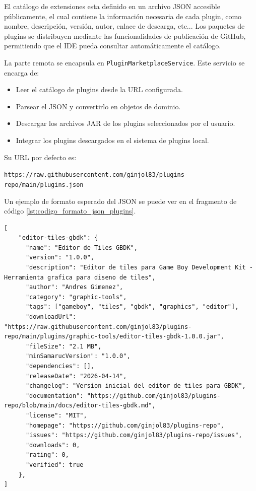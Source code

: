 \documentclass[../../main.tex]{subfiles}
\begin{document}
El catálogo de extensiones esta definido en un archivo JSON accesible públicamente, el cual contiene la información necesaria de cada plugin, como nombre, descripción, versión, autor, enlace de descarga, etc... Los paquetes de plugins se distribuyen mediante las funcionalidades de publicación de GitHub, permitiendo que el IDE pueda consultar automáticamente el catálogo.



La parte remota se encapsula en \lstinline|PluginMarketplaceService|. Este servicio se encarga de:

\begin{itemize}
    \item Leer el catálogo de plugins desde la URL configurada.
    \item Parsear el JSON y convertirlo en objetos de dominio.
    \item Descargar los archivos JAR de los plugins seleccionados por el usuario.
    \item Integrar los plugins descargados en el sistema de plugins local.
\end{itemize}

\clearpage

Su URL por defecto es: 

\lstinline|https://raw.githubusercontent.com/ginjol83/plugins-repo/main/plugins.json|

Un ejemplo de formato esperado del JSON se puede ver en el fragmento de código \ref{lst:codigo_formato_json_plugins}.

\begin{lstlisting}[style=mystyle, caption={Formato esperado del JSON para el marketplace de plugins}, label={lst:codigo_formato_json_plugins}]
[
    "editor-tiles-gbdk": {
      "name": "Editor de Tiles GBDK",
      "version": "1.0.0",
      "description": "Editor de tiles para Game Boy Development Kit - Herramienta grafica para diseno de tiles",
      "author": "Andres Gimenez",
      "category": "graphic-tools",
      "tags": ["gameboy", "tiles", "gbdk", "graphics", "editor"],
      "downloadUrl": "https://raw.githubusercontent.com/ginjol83/plugins-repo/main/plugins/graphic-tools/editor-tiles-gbdk-1.0.0.jar",
      "fileSize": "2.1 MB",
      "minSamarucVersion": "1.0.0",
      "dependencies": [],
      "releaseDate": "2026-04-14",
      "changelog": "Version inicial del editor de tiles para GBDK",
      "documentation": "https://github.com/ginjol83/plugins-repo/blob/main/docs/editor-tiles-gbdk.md",
      "license": "MIT",
      "homepage": "https://github.com/ginjol83/plugins-repo",
      "issues": "https://github.com/ginjol83/plugins-repo/issues",
      "downloads": 0,
      "rating": 0,
      "verified": true
    },
]
\end{lstlisting}
\end{document}
